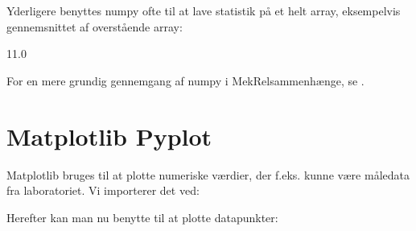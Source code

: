 \documentclass[letterpaper,10pt,english]{jupyterBook}
\begin{document}
Yderligere benyttes numpy ofte til at lave statistik på et helt array, eksempelvis gennemsnittet af overstående array:

\begin{sphinxVerbatim}[commandchars=\\\{\}]
\end{sphinxVerbatim}

\begin{sphinxVerbatim}[commandchars=\\\{\}]
11.0
\end{sphinxVerbatim}

For en mere grundig gennemgang af numpy i MekRel\sphinxhyphen{}sammenhænge, se {\hyperref[\detokenize{notebooks/MekRel/Numpy::doc}]{}}.


\section{Matplotlib Pyplot}
\label{\detokenize{notebooks/Intro_til_pakker:matplotlib-pyplot}}
Matplotlib bruges til at plotte numeriske værdier, der f.eks. kunne være måledata fra laboratoriet. Vi importerer det ved:

\begin{sphinxVerbatim}[commandchars=\\\{\}]
   
\end{sphinxVerbatim}

Herefter kan man nu benytte  til at plotte datapunkter:

\begin{sphinxVerbatim}[commandchars=\\\{\}]
  \PYG{p}{[}    \PYG{p}{]}
  

  
\end{sphinxVerbatim}
\end{document}
